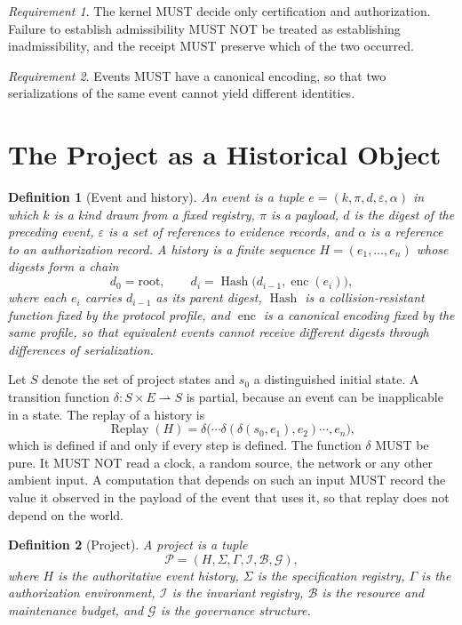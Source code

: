 \documentclass[11pt]{article}
\newtheorem{definition}{Definition}
\theoremstyle{remark}
\newtheorem{requirement}{Requirement}
\newcommand{\Replay}{\operatorname{Replay}}
\newcommand{\Pp}{\mathcal{P}}
\begin{document}
\begin{requirement}
The kernel MUST decide only certification and authorization. Failure to establish admissibility MUST NOT be treated as establishing inadmissibility, and the receipt MUST preserve which of the two occurred.
\end{requirement}

\begin{requirement}
Events MUST have a canonical encoding, so that two serializations of the same event cannot yield different identities.
\end{requirement}

\section{The Project as a Historical Object}\label{sec:project}

\begin{definition}[Event and history]
An \emph{event} is a tuple $e=(k,\pi,d,\varepsilon,\alpha)$ in which $k$ is a kind drawn from a fixed registry, $\pi$ is a payload, $d$ is the digest of the preceding event, $\varepsilon$ is a set of references to evidence records, and $\alpha$ is a reference to an authorization record. A \emph{history} is a finite sequence $H=(e_1,\dots,e_n)$ whose digests form a chain
\[
d_0=\mathrm{root},\qquad d_i=\operatorname{Hash}\bigl(d_{i-1},\operatorname{enc}(e_i)\bigr),
\]
where each $e_i$ carries $d_{i-1}$ as its parent digest, $\operatorname{Hash}$ is a collision-resistant function fixed by the protocol profile, and $\operatorname{enc}$ is a canonical encoding fixed by the same profile, so that equivalent events cannot receive different digests through differences of serialization.
\end{definition}

Let $S$ denote the set of project states and $s_0$ a distinguished initial state. A transition function $\delta:S\times E\rightharpoonup S$ is partial, because an event can be inapplicable in a state. The replay of a history is
\[
\Replay(H)=\delta\bigl(\cdots\delta(\delta(s_0,e_1),e_2)\cdots,e_n\bigr),
\]
which is defined if and only if every step is defined. The function $\delta$ MUST be pure. It MUST NOT read a clock, a random source, the network or any other ambient input. A computation that depends on such an input MUST record the value it observed in the payload of the event that uses it, so that replay does not depend on the world.

\begin{definition}[Project]
A project is a tuple
\[
\Pp=(H,\Sigma,\Gamma,\mathcal I,\mathcal B,\mathcal G),
\]
where $H$ is the authoritative event history, $\Sigma$ is the specification registry, $\Gamma$ is the authorization environment, $\mathcal I$ is the invariant registry, $\mathcal B$ is the resource and maintenance budget, and $\mathcal G$ is the governance structure.
\end{definition}
\end{document}
